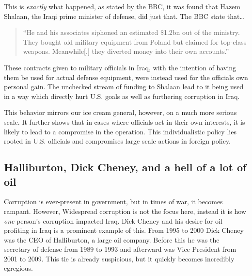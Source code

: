 \documentclass[12pt, twoside]{article}
\begin{document}
        This is \textit{exactly} what happened, as stated by the BBC, it was found that Hazem Shalaan, the Iraqi prime minister of defense, did just that. The BBC state that\ldots

        \begin{quote}
            ``He and his associates siphoned an estimated \$1.2bn out of the ministry. They bought old military equipment from Poland but claimed for top-class weapons. Meanwhile[,] they diverted money into their own accounts.'' \parencite{bbc2008iraqcontracts}
        \end{quote}

        These contracts given to military officials in Iraq, with the intention of having them be used for actual defense equipment, were instead used for the officials own personal gain. The unchecked stream of funding to Shalaan lead to it being used in a way which directly hurt U.S. goals as well as furthering corruption in Iraq.  
        
        This behavior mirrors our ice cream general, however, on a much more serious scale. It further shows that in cases where officials act in their own interests, it is likely to lead to a compromise in the operation. This individualistic policy lies rooted in U.S. officials and compromises large scale actions in foreign policy.
        

    \subsection{Halliburton, Dick Cheney, and a hell of a lot of oil}
        Corruption is ever-present in government, but in times of war, it becomes rampant. However, Widespread corruption is not the focus here, instead it is how \textit{one} person's corruption impacted Iraq. Dick Cheney and his desire for oil profiting in Iraq is a prominent example of this. From 1995 to 2000 Dick Cheney was the CEO of Halliburton, a large oil company. Before this he was the secretary of defense from 1989 to 1993 and afterward was Vice President from 2001 to 2009. This tie is already suspicious, but it quickly becomes incredibly egregious. 
        
\end{document}
